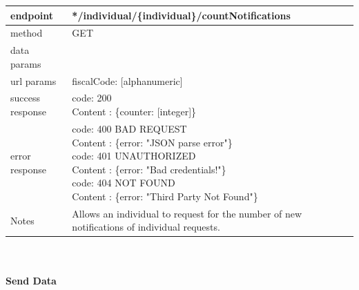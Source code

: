 \begin{legal}
\begin{legal}
\begin{itemize}
								\begin{tabularx}{\linewidth}{| l| l }
									\hline
									endpoint & */individual/\{individual\}/countNotifications \\
									\hline
									method & GET \\
									\hline
									data params & \\
									\hline
									url params &
									\parbox{0.7\textwidth}{
										\bigskip
										fiscalCode: [alphanumeric]
										\bigskip
									} \\
									\hline
									success response &
									\parbox{0.7\textwidth}{
										\bigskip
										code: 200\\
										Content : \{counter: [integer]\}
										\bigskip
									} \\
									\hline
									error response &
									\parbox{0.7\textwidth}{
										\bigskip
										code: 400 BAD REQUEST \\
										Content : \{error: "JSON parse error"\}\\
										code: 401 UNAUTHORIZED \\
										Content : \{error: "Bad credentials!"\}\\
										code: 404 NOT FOUND \\
										Content : \{error: "Third Party Not Found"\}
										\bigskip
									} \\
									\hline
									Notes & 
									\parbox{0.7\textwidth}{
										\bigskip Allows an individual to request for the number of new notifications of individual requests.
									\bigskip}  \\
									\hline
								\end{tabularx}\\\\
								
								\textbf{Send Data} \\
			

\end{itemize}
\end{legal}
\end{legal}
